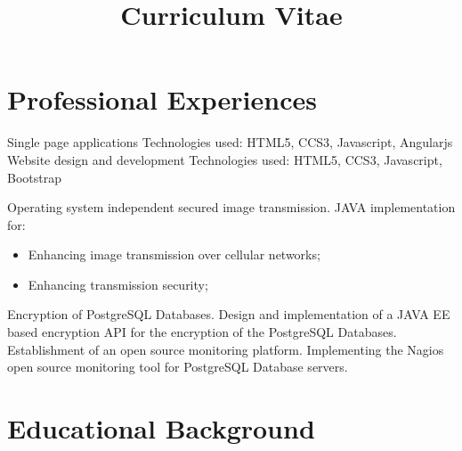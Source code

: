 \documentclass[11pt,a4paper,sans]{moderncv}        %
\title{Curriculum Vitae}                               %
\begin{document}
	\makecvtitle

	\section{Professional Experiences}
				{Single page applications
				\newline{}
				Technologies used: HTML5, CCS3, Javascript, Angularjs
				}
				{Website design and development
				\newline{}
				Technologies used: HTML5, CCS3, Javascript, Bootstrap
				}
				{Operating system independent secured image transmission.\newline{}%
					JAVA implementation for:%
					\begin{itemize}%
						\item Enhancing image transmission over cellular networks;
						\item Enhancing transmission security;
					\end{itemize}
				}
				{Encryption of PostgreSQL Databases.
				\newline{}
				Design and implementation of a JAVA EE based encryption API for the encryption of the
					PostgreSQL Databases.
				}
				{Establishment of an open source monitoring platform. 
				\newline{}
				Implementing the Nagios open source monitoring tool for PostgreSQL Database servers.
				}
		
    \section{Educational Background}
\end{document}
